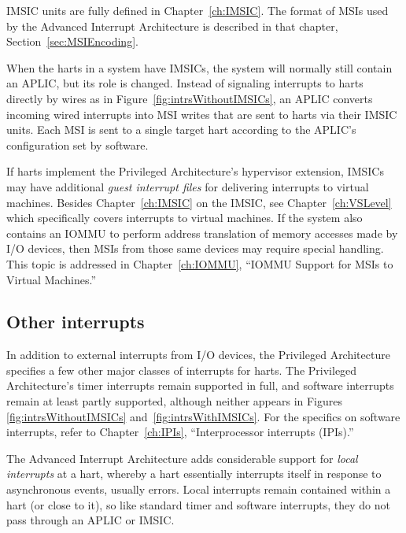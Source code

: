 IMSIC units are fully defined in Chapter~\ref{ch:IMSIC}.
The format of MSIs used by the {\RISCV} Advanced Interrupt Architecture
is described in that chapter, Section~\ref{sec:MSIEncoding}.

When the harts in a {\RISCV} system have IMSICs, the system will
normally still contain an APLIC, but its role is changed.
Instead of signaling interrupts to harts directly by wires as in
Figure~\ref{fig:intrsWithoutIMSICs}, an APLIC converts incoming
wired interrupts into MSI writes that are sent to harts via their IMSIC
units.
Each MSI is sent to a single target hart according to the APLIC's
configuration set by software.

If {\RISCV} harts implement the Privileged Architecture's hypervisor
extension, IMSICs may have additional \emph{guest interrupt files} for
delivering interrupts to virtual machines.
Besides Chapter~\ref{ch:IMSIC} on the IMSIC, see
Chapter~\ref{ch:VSLevel} which specifically covers interrupts to
virtual machines.
If the system also contains an \mbox{IOMMU} to perform address translation
of memory accesses made by I/O devices, then MSIs from those same
devices may require special handling.
This topic is addressed in Chapter~\ref{ch:IOMMU}, ``\mbox{IOMMU} Support
for MSIs to Virtual Machines.''

\subsection{Other interrupts}

In addition to external interrupts from I/O devices, the {\RISCV}
Privileged Architecture specifies a few other major classes of
interrupts for harts.
The Privileged Architecture's timer interrupts remain supported
in full, and software interrupts remain at least partly supported,
although neither appears in Figures \ref{fig:intrsWithoutIMSICs}
and~\ref{fig:intrsWithIMSICs}.
For the specifics on software interrupts, refer to
Chapter~\ref{ch:IPIs}, ``Interprocessor interrupts (IPIs).''

The Advanced Interrupt Architecture adds considerable support
for \emph{local interrupts} at a hart, whereby a hart essentially
interrupts itself in response to asynchronous events, usually errors.
Local interrupts remain contained within a hart (or close to it),
so like standard {\RISCV} timer and software interrupts, they do not
pass through an APLIC or IMSIC.

